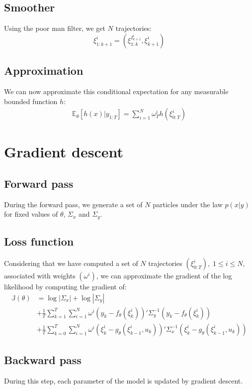 \documentclass[10pt,a4paper]{report}
\begin{document}
\subsection{Smoother}
Using the poor man filter, we get $N$ trajectories:
$$\xi_{1:k+1}^{i} = (\xi_{1:k}^{I_{k+1}^i}, \xi_{k+1}^i)$$

\subsection{Approximation}
We can now approximate this conditional expectation for any measurable bounded function $h$:
\begin{align*}
	\mathbb{E}_\theta \left[ h(x) | y_{1:T} \right] = \sum_{i=1}^N \omega_T^i h(\xi_{0:T}^i)
\end{align*}

\section{Gradient descent}
\label{sec:gradient_descent}

\subsection{Forward pass}
During the forward pass, we generate a set of $N$ particles under the law $p(x|y)$ for fixed values of $\theta$, $\Sigma_x$ and $\Sigma_y$.

\subsection{Loss function}
Considering that we have computed a set of $N$ trajectories $(\xi^i_{0:T}),\;1 \leq i \leq N$, associated with weights $(\omega^i)$, we can approximate the gradient of the log likelihood by computing the gradient of:
\begin{align*}
	\mathbb{J}(\theta) & = \log |\Sigma_x| + \log |\Sigma_y|                                                                                                        \\
			   & + \frac{1}{T}\sum_{k=1}^T \sum_{i=1}^N \omega^i (y_k - f_\theta(\xi_k^i))' \Sigma_y^{-1} (y_k - f_\theta(\xi_k^i))                         \\
			   & + \frac{1}{T}\sum_{k=0}^T \sum_{i=1}^N \omega^i (\xi_k^i - g_\theta(\xi_{k-1}^i, u_k))'\Sigma_x^{-1}(\xi_k^i - g_\theta(\xi_{k-1}^i, u_k))
\end{align*}

\subsection{Backward pass}
During this step, each parameter of the model is updated by gradient descent.
\end{document}

